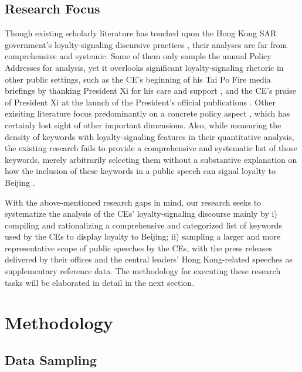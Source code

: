 \documentclass[9pt,a4paper,twocolumn,twoside]{rho-class/rho}
\begin{document}
    \subsection{Research Focus}

        Though existing scholarly literature has touched upon the Hong Kong SAR government's loyalty-signaling discursive practices \parencite{deng2025legitimation, peck2024hongkong, kwan2023introduction}, 
        their analyses are far from comprehensive and systemic. Some of them only sample the annual Policy Addresses for analysis, yet it overlooks significant loyalty-signaling 
        rhetoric in other public settings, such as the CE's beginning of his Tai Po Fire media briefings by thanking President Xi for his care and support 
        \parencite{govhk2025fire}, and the CE's praise of President Xi at the launch of the President's official publications \parencite{govhk2026speech}.  Other exisiting literature focus 
        predominantly on a concrete policy aspect \parencite{kwan2023introduction}, which has certainly lost sight of other important dimensions. Also, while measuring the density 
        of keywords with loyalty-signaling features in their quantitative analysis, the existing research fails to provide a comprehensive and systematic list of those keywords, 
        merely arbitrarily selecting them without a substantive explanation on how the inclusion of these keywords in a public speech can signal loyalty to Beijing \parencite{deng2025legitimation, peck2024hongkong}. 

        With the above-mentioned research gaps in mind, our research seeks to systematize the analysis of the CEs' loyalty-signaling discourse mainly by i) compiling and rationalizing 
        a comprehensive and categorized list of keywords used by the CEs to display loyalty to Beijing; ii) sampling a larger and more representative scope of public speeches by the CEs, 
        with the press releases delivered by their offices and the central leaders' Hong Kong-related speeches as supplementary reference data. The methodology for executing these 
        research tasks will be elaborated in detail in the next section.
    
\section{Methodology}

    \subsection{Data Sampling}
\end{document}

